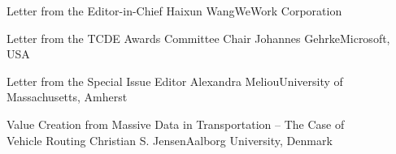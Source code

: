 \documentclass[11pt]{article}
\begin{document}


\begin{bulletin}


%
%

\begin{lettersection}


\begin{letter}{Letter from the Editor-in-Chief}
{Haixun Wang}{WeWork Corporation}

\end{letter}
%
\newpage
%

\begin{letter}{Letter from the TCDE Awards Committee Chair}
{Johannes Gehrke}{Microsoft, USA}

\end{letter}

\newpage

\begin{letter}{Letter from the Special Issue Editor}
{Alexandra Meliou}{University of Massachusetts, Amherst}

\end{letter}

\end{lettersection}




\begin{opinionsection}
\begin{opinion}{Value Creation from Massive Data in Transportation -- The Case of\\ Vehicle Routing}
{Christian S. Jensen}{Aalborg University, Denmark}

\end{opinion}
\end{opinionsection}





\end{bulletin}
\end{document}
